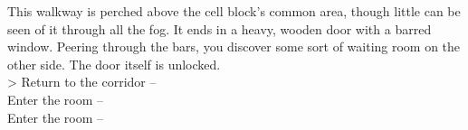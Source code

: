 This walkway is perched above the cell block’s common area, though little can be seen of it through all the fog. It ends in a heavy, wooden door with a barred window. Peering through the bars, you discover some sort of waiting room on the other side. The door itself is unlocked.\\

> Return to the corridor -- \\
 Enter the room -- \\
 Enter the room -- \\